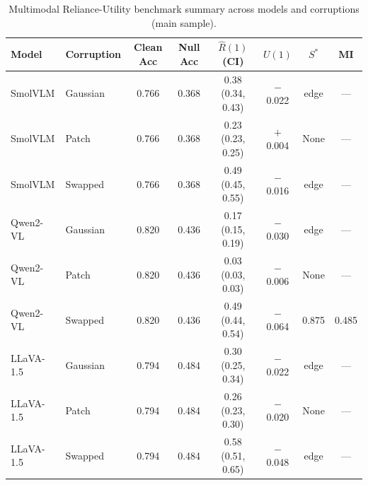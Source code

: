 \begin{table}[t]
\centering
\caption{Multimodal Reliance-Utility benchmark summary across models and corruptions (main sample).}
\label{tab:vlm-main-summary}
{\footnotesize\setlength{\tabcolsep}{3pt}%
\begin{tabular}{llcccccc}
\toprule
\textbf{Model} & \textbf{Corruption} & Clean Acc & Null Acc & $\hat{R}(1)$ (CI) & $U(1)$ & $S^*$ & MI \\
\midrule
SmolVLM   & Gaussian & 0.766 & 0.368 & 0.38 (0.34, 0.43) & $-$0.022 & edge & --- \\
SmolVLM   & Patch    & 0.766 & 0.368 & 0.23 (0.23, 0.25) & $+$0.004 & None & --- \\
SmolVLM   & Swapped  & 0.766 & 0.368 & 0.49 (0.45, 0.55) & $-$0.016 & edge & --- \\
Qwen2-VL  & Gaussian & 0.820 & 0.436 & 0.17 (0.15, 0.19) & $-$0.030 & edge & --- \\
Qwen2-VL  & Patch    & 0.820 & 0.436 & 0.03 (0.03, 0.03) & $-$0.006 & None & --- \\
Qwen2-VL  & Swapped  & 0.820 & 0.436 & 0.49 (0.44, 0.54) & $-$0.064 & 0.875 & 0.485 \\
LLaVA-1.5 & Gaussian & 0.794 & 0.484 & 0.30 (0.25, 0.34) & $-$0.022 & edge & --- \\
LLaVA-1.5 & Patch    & 0.794 & 0.484 & 0.26 (0.23, 0.30) & $-$0.020 & None & --- \\
LLaVA-1.5 & Swapped  & 0.794 & 0.484 & 0.58 (0.51, 0.65) & $-$0.048 & edge & --- \\
\bottomrule
\end{tabular}}
\end{table}
